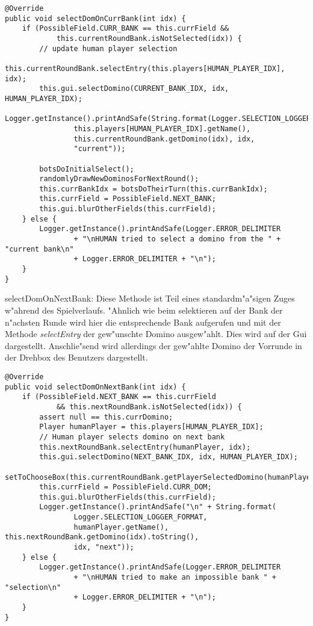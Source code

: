 \begin{lstlisting}[float,style=CodeHighlighting,label=game_selectDomOnCurrBank,caption=Game - selectDomOnCurrBank]
@Override
public void selectDomOnCurrBank(int idx) {
    if (PossibleField.CURR_BANK == this.currField &&
    		this.currentRoundBank.isNotSelected(idx)) {
        // update human player selection
        this.currentRoundBank.selectEntry(this.players[HUMAN_PLAYER_IDX], idx);
        this.gui.selectDomino(CURRENT_BANK_IDX, idx, HUMAN_PLAYER_IDX);
        Logger.getInstance().printAndSafe(String.format(Logger.SELECTION_LOGGER_FORMAT,
                this.players[HUMAN_PLAYER_IDX].getName(),
                this.currentRoundBank.getDomino(idx), idx,
                "current"));

        botsDoInitialSelect();
        randomlyDrawNewDominosForNextRound();
        this.currBankIdx = botsDoTheirTurn(this.currBankIdx);
        this.currField = PossibleField.NEXT_BANK;
        this.gui.blurOtherFields(this.currField);
    } else {
        Logger.getInstance().printAndSafe(Logger.ERROR_DELIMITER
                + "\nHUMAN tried to select a domino from the " + "current bank\n" 
                + Logger.ERROR_DELIMITER + "\n");
    }
}
\end{lstlisting}

selectDomOnNextBank: Diese Methode ist Teil eines standardm"a"sigen Zuges w"ahrend des Spielverlaufs. "Ahnlich wie beim selektieren auf der Bank der n"achsten Runde wird hier die entsprechende Bank aufgerufen und mit der Methode \emph{selectEntry} der gew"unschte Domino ausgew"ahlt. Dies wird auf der Gui dargestellt. Anschlie"send wird allerdings der gew"ahlte Domino der Vorrunde in der Drehbox des Benutzers dargestellt.

\begin{lstlisting}[float,style=CodeHighlighting,caption=Game - selectDomOnNextBank,label=game_selectDomOnNextBank]
@Override
public void selectDomOnNextBank(int idx) {
    if (PossibleField.NEXT_BANK == this.currField 
    		&& this.nextRoundBank.isNotSelected(idx)) {
        assert null == this.currDomino;
        Player humanPlayer = this.players[HUMAN_PLAYER_IDX];
        // Human player selects domino on next bank
        this.nextRoundBank.selectEntry(humanPlayer, idx);
        this.gui.selectDomino(NEXT_BANK_IDX, idx, HUMAN_PLAYER_IDX);
        setToChooseBox(this.currentRoundBank.getPlayerSelectedDomino(humanPlayer));
        this.currField = PossibleField.CURR_DOM;
        this.gui.blurOtherFields(this.currField);
        Logger.getInstance().printAndSafe("\n" + String.format(
        		Logger.SELECTION_LOGGER_FORMAT,
                humanPlayer.getName(), this.nextRoundBank.getDomino(idx).toString(),
                idx, "next"));
    } else {
        Logger.getInstance().printAndSafe(Logger.ERROR_DELIMITER
                + "\nHUMAN tried to make an impossible bank " + "selection\n" 
                + Logger.ERROR_DELIMITER + "\n");
    }
}
\end{lstlisting}